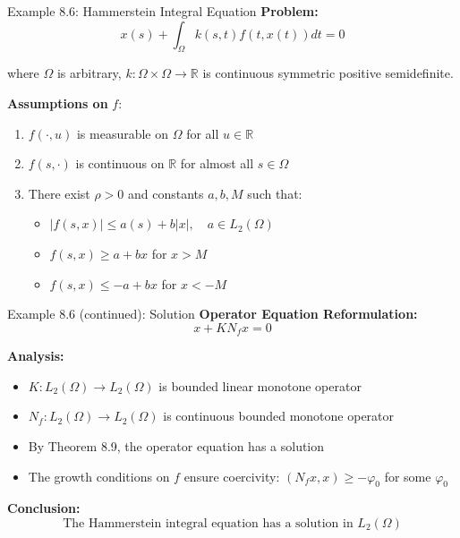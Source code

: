 \documentclass[aspectratio=169,10pt]{beamer}
\theoremstyle{plain}
\theoremstyle{definition}
\begin{document}
\begin{frame}[fragile]{Example 8.6: Hammerstein Integral Equation}
  \textbf{Problem:}
  \[
    x(s) + \int_{\Omega} k(s,t) f(t, x(t)) dt = 0
  \]

  where $\Omega$ is arbitrary, $k: \Omega \times \Omega \to \mathbb{R}$ is continuous symmetric positive semidefinite.

  \vspace{0.3cm}
  \textbf{Assumptions on } $f$:
  \begin{enumerate}
    \item $f(\cdot, u)$ is measurable on $\Omega$ for all $u \in \mathbb{R}$
    \item $f(s, \cdot)$ is continuous on $\mathbb{R}$ for almost all $s \in \Omega$
    \item There exist $\rho > 0$ and constants $a, b, M$ such that:
      \begin{itemize}
        \item $|f(s,x)| \leq a(s) + b|x|, \quad a \in L_2(\Omega)$
        \item $f(s,x) \geq a + bx$ for $x > M$
        \item $f(s,x) \leq -a + bx$ for $x < -M$
      \end{itemize}
  \end{enumerate}
\end{frame}

\begin{frame}{Example 8.6 (continued): Solution}
  \textbf{Operator Equation Reformulation:}
  \[
    x + K N_f x = 0
  \]

  \vspace{0.2cm}
  \textbf{Analysis:}
  \begin{itemize}
    \item $K: L_2(\Omega) \to L_2(\Omega)$ is bounded linear monotone operator
    \item $N_f: L_2(\Omega) \to L_2(\Omega)$ is continuous bounded monotone operator
    \item By Theorem 8.9, the operator equation has a solution
    \item The growth conditions on $f$ ensure coercivity: $(N_f x, x) \geq -\varphi_0$ for some $\varphi_0$
  \end{itemize}

  \vspace{0.3cm}
  \textbf{Conclusion:}
  \[
    \boxed{\text{The Hammerstein integral equation has a solution in } L_2(\Omega)}
  \]
\end{frame}
\end{document}
